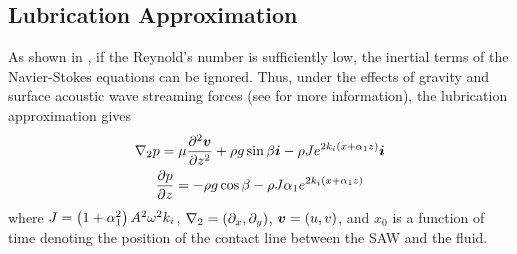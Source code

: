 
\subsection{Lubrication Approximation}
As shown in \cite{kondic2003instabilities}, if the Reynold's number is sufficiently low, the inertial terms of the Navier-Stokes equations 
can be ignored. Thus, under the effects of gravity and surface acoustic wave streaming forces (see \cite{shiokawa1994saw} for more information), the lubrication approximation gives
\begin{gather}
    \nabla_2 p = \mu \frac{\partial^2 \boldsymbol{v}}{\partial z^2} + \rho g \sin\beta \boldsymbol{i} - \rho Je^{2k_i \left( x + \alpha_1 z \right)}\boldsymbol{i}
    \label{eq:pressure_grad}\\
    \frac{\partial p}{\partial z} = -\rho g \cos\beta - \rho J\alpha_1 e^{2k_i \left( x + \alpha_1 z \right)}
    \label{eq:pressure_z}
\end{gather}
where $J = \left( 1 + \alpha_1^2 \right)A^2\omega^2k_i$,  $\nabla_2 = \left( \partial_x, \partial_y \right)$, 
$\boldsymbol{v} = \left( u, v \right)$, and $x_0$ is a function of time denoting the position of the contact line 
between the SAW and the fluid. 

